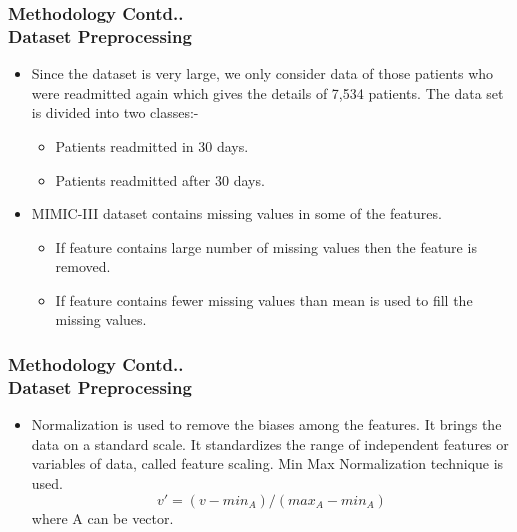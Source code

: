 \documentclass{beamer}
\begin{document}
\begin{frame}\frametitle{Methodology Contd..\\\footnotesize{Dataset Preprocessing}}
\begin{itemize}
    \item Since the dataset is very large, we only consider data of those patients who were readmitted again which gives the details of 7,534 patients. The data set is divided into two classes:-
    \begin{itemize}
        \item Patients readmitted in 30 days.
        \item Patients readmitted after 30 days.
    \end{itemize}
    \item MIMIC-III dataset contains missing values in some of the features.
    \begin{itemize}
        \item If feature contains large number of missing values then the feature is removed.
        \item If feature contains fewer missing values than mean is used to fill the missing values.
    \end{itemize}
\end{itemize}

\end{frame}

\begin{frame}\frametitle{Methodology Contd..\\\footnotesize{Dataset Preprocessing}}
\begin{itemize}
    \item Normalization is used to remove the biases among the features. It brings the data on a standard scale. It standardizes the range of independent features or variables of data, called feature scaling. Min Max Normalization technique is used.
    \begin{equation}
        v' = (v-min_A)/(max_A-min_A)
    \end{equation}
    where A can be vector.
\end{itemize}

\end{frame}
\end{document}
